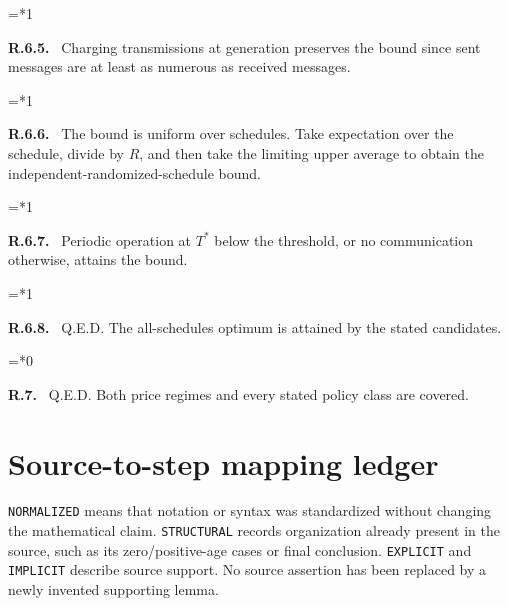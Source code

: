 \documentclass[11pt,letterpaper]{article}
\newenvironment{proofstep}[2]{%
  \begin{list}{}{\leftmargin=\dimexpr 0.17in*#2\relax%
  \setlength{\rightmargin}{0pt}\setlength{\topsep}{5pt}\setlength{\parsep}{2pt}}%
  \item[]\textbf{\textcolor{ink}{#1.}}\ }{\end{list}}
\begin{document}
\begin{proofstep}{R.6.5}{1}
Charging transmissions at generation preserves the bound since sent messages are at least as numerous as received messages.
\par\nopagebreak{}
\end{proofstep}
\begin{proofstep}{R.6.6}{1}
The bound is uniform over schedules. Take expectation over the schedule, divide by $R$, and then take the limiting upper average to obtain the independent-randomized-schedule bound.
\par\nopagebreak{}
\end{proofstep}
\begin{proofstep}{R.6.7}{1}
Periodic operation at $T^*$ below the threshold, or no communication otherwise, attains the bound.
\par\nopagebreak{}
\end{proofstep}
\begin{proofstep}{R.6.8}{1}
Q.E.D. The all-schedules optimum is attained by the stated candidates.
\par\nopagebreak{}
\end{proofstep}
\begin{proofstep}{R.7}{0}
Q.E.D. Both price regimes and every stated policy class are covered.
\par\nopagebreak{}
\end{proofstep}

\section{Source-to-step mapping ledger}
\texttt{NORMALIZED} means that notation or syntax was standardized without changing the mathematical claim. \texttt{STRUCTURAL} records organization already present in the source, such as its zero/positive-age cases or final conclusion. \texttt{EXPLICIT} and \texttt{IMPLICIT} describe source support. No source assertion has been replaced by a newly invented supporting lemma.
\end{document}

